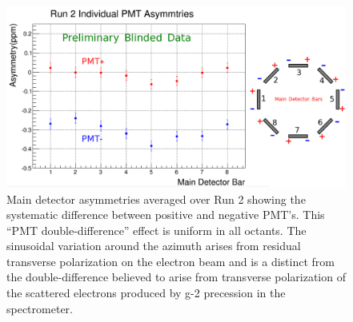 \begin{figure}
\centering
\includegraphics[width=5.8in]{./Pictures/PMT_DD.png}
\caption{\label{fig:pmt_dd}Main detector asymmetries averaged over Run 2 showing the systematic difference between positive and negative PMT's. This ``PMT double-difference'' effect is uniform in all octants. The sinusoidal variation around the azimuth arises from residual transverse polarization on the electron beam and is a distinct from the double-difference believed to arise from transverse polarization of the scattered electrons produced by g-2 precession in the spectrometer. }
\end{figure}

